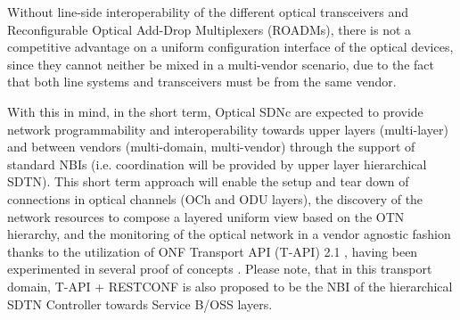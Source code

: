 \documentclass[10pt, conference]{IEEEtran}
\begin{document}
Without line-side interoperability of the different optical transceivers and Reconfigurable Optical Add-Drop Multiplexers (ROADMs), there is not a competitive advantage on a uniform configuration interface of the optical devices, since they cannot neither be mixed in a multi-vendor scenario, due to the fact that both line systems and transceivers must be from the same vendor.

With this in mind, in the short term, Optical SDNc are expected to provide network programmability and interoperability towards upper layers (multi-layer) and between vendors (multi-domain, multi-vendor) through the support of standard NBIs (i.e. coordination will be provided by upper layer hierarchical SDTN). This short term approach will enable the setup and tear down of connections in optical channels (OCh and ODU layers), the discovery of the network resources to compose a layered uniform view based on the OTN hierarchy, and the monitoring of the optical network in a vendor agnostic fashion thanks to the utilization of ONF Transport API (T-API) 2.1 \cite{lopez2016transport}, having been experimented in several proof of concepts \cite{mayoral2016first}. Please note, that in this transport domain, T-API + RESTCONF is also proposed to be the NBI of the hierarchical SDTN Controller towards Service B/OSS layers.

\end{document}

